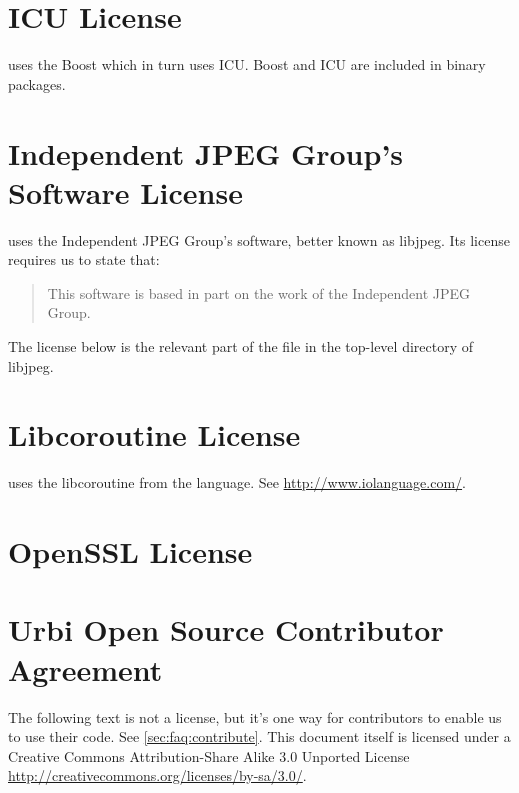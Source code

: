 
\section{ICU License}

\usdk uses the Boost which in turn uses ICU.  Boost and ICU are included in
binary packages.



\section{Independent JPEG Group's Software License}

\usdk uses the Independent JPEG Group's software, better known as libjpeg.
Its license requires us to state that:

\begin{quote}
  This software is based in part on the work of the Independent JPEG Group.
\end{quote}

The license below is the relevant part of the  file in the
top-level directory of libjpeg.



\section{Libcoroutine License}

\urbi uses the libcoroutine from the  language.  See
\url{http://www.iolanguage.com/}.


\section{OpenSSL License}


\clearpage
\section{Urbi Open Source Contributor Agreement}
\label{sec:license:uosca}

The following text is not a license, but it's one way for \usdk contributors
to enable us to use their code.  See \autoref{sec:faq:contribute}.  This
document itself is licensed under a Creative Commons Attribution-Share Alike
3.0 Unported License \url{http://creativecommons.org/licenses/by-sa/3.0/}.


